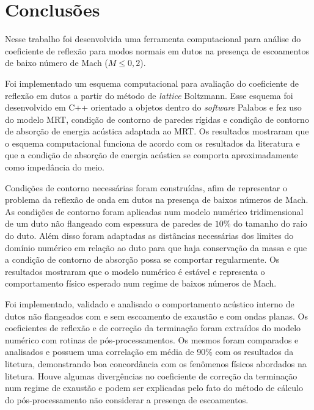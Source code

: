 \chapter{Conclusões}

Nesse trabalho foi desenvolvida uma ferramenta computacional para análise do coeficiente de reflexão para modos normais em dutos na presença de escoamentos de baixo número de Mach ($M \leq 0,2$). 

Foi implementado um esquema computacional para avaliação do coeficiente de reflexão em dutos a partir do método de \textit{lattice} Boltzmann. Esse esquema foi desenvolvido em C++ orientado a objetos dentro do \textit{software} Palabos e fez uso do modelo MRT, condição de contorno de paredes rígidas e condição de contorno de absorção de energia acústica adaptada ao MRT. Os resultados mostraram que o esquema computacional funciona de acordo com os resultados da literatura e que a condição de absorção de energia acústica se comporta aproximadamente como impedância do meio.

Condições de contorno necessárias foram construídas, afim de representar o problema da reflexão de onda em dutos na presença de baixos números de Mach. As condições de contorno foram aplicadas num modelo numérico tridimensional de um duto não flangeado com espessura de paredes de $10 \%$ do tamanho do raio do duto. Além disso foram adaptadas as distâncias necessárias dos limites do domínio numérico em relação ao duto para que haja conservação da massa e que a condição de contorno de absorção possa se comportar regularmente. Os resultados mostraram que o modelo numérico é estável e representa o comportamento físico esperado num regime de baixos números de Mach.

Foi implementado, validado e analisado o comportamento acústico interno de dutos não flangeados com e sem escoamento de exaustão e com ondas planas. Os coeficientes de reflexão e de correção da terminação foram extraídos do modelo numérico com rotinas de pós-processamentos. Os mesmos foram comparados e analisados e possuem uma correlação em média de 90\%  com os resultados da litetura, demonstrando boa concordância com os fenômenos físicos abordados na litetura. Houve algumas divergências no coeficiente de correção da terminação num regime de exaustão e podem ser explicadas pelo fato do método de cálculo do pós-processamento não considerar a presença de escoamentos.  


